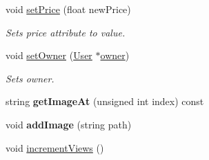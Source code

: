 \begin{DoxyCompactItemize}
void \hyperlink{class_advertisement_af47b69a36414d09f24bc2e9173e4ab8b}{set\+Price} (float new\+Price)
\begin{DoxyCompactList}\small\item\em Sets price attribute to value. \end{DoxyCompactList}\item 
void \hyperlink{class_advertisement_a3333256bc60f96a933970fdfed317116}{set\+Owner} (\hyperlink{class_user}{User} $\ast$\hyperlink{class_advertisement_a10398131c5aadcd1fdf08d6acabec45f}{owner})
\begin{DoxyCompactList}\small\item\em Sets owner. \end{DoxyCompactList}\item 
\hypertarget{class_advertisement_a260fbb1a64495a5e99591202389744a0}{}string {\bfseries get\+Image\+At} (unsigned int index) const \label{class_advertisement_a260fbb1a64495a5e99591202389744a0}

\item 
\hypertarget{class_advertisement_a3925f5b2411ae7ac00a56f3398ae9353}{}void {\bfseries add\+Image} (string path)\label{class_advertisement_a3925f5b2411ae7ac00a56f3398ae9353}

\item 
\hypertarget{class_advertisement_abd20373813b956bac9a6fd78a4947ebc}{}void \hyperlink{class_advertisement_abd20373813b956bac9a6fd78a4947ebc}{increment\+Views} ()\label{class_advertisement_abd20373813b956bac9a6fd78a4947ebc}


\end{DoxyCompactItemize}
